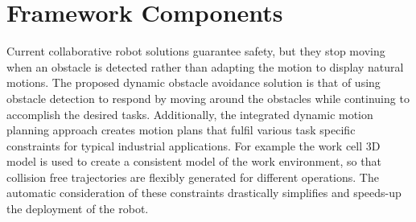 \section{Framework Components}
\label{sec:framework}
Current collaborative robot solutions guarantee safety, but they stop moving when an obstacle is detected rather than adapting the motion to display natural motions. The proposed dynamic obstacle avoidance solution is that of using obstacle detection to respond by moving around the obstacles while continuing to accomplish the desired tasks. Additionally, the integrated dynamic motion planning approach creates motion plans that fulfil various task specific constraints for typical industrial applications. For example the work cell 3D model is used to create a consistent model of the work environment, so that collision free trajectories are flexibly generated for different operations. The automatic consideration of these constraints drastically simplifies and speeds-up the deployment of the robot.

